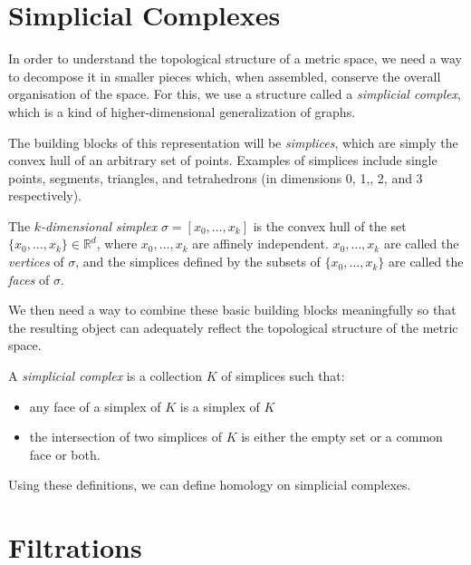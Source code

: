 \documentclass[a4paper,11pt,openany,extrafontsizes]{memoir}
\begin{document}
\section{Simplicial Complexes}%
\label{sec:simplicial-complexes}

In order to understand the topological structure of a metric space, we
need a way to decompose it in smaller pieces which, when assembled,
conserve the overall organisation of the space. For this, we use a
structure called a \emph{simplicial complex}, which is a kind of
higher-dimensional generalization of graphs.

The building blocks of this representation will be \emph{simplices},
which are simply the convex hull of an arbitrary set of
points. Examples of simplices include single points, segments,
triangles, and tetrahedrons (in dimensions 0, 1,, 2, and 3
respectively).

\begin{defn}[Simplex]
  The \emph{$k$-dimensional simplex} $\sigma = [x_0,\ldots,x_k]$ is
  the convex hull of the set $\{x_0,\ldots,x_k\} \in \mathbb{R}^d$,
  where $x_0,\ldots,x_k$ are affinely independent. $x_0,\ldots,x_k$
  are called the \emph{vertices} of $\sigma$, and the simplices
  defined by the subsets of $\{x_0,\ldots,x_k\}$ are called the
  \emph{faces} of $\sigma$.
\end{defn}

We then need a way to combine these basic building blocks meaningfully
so that the resulting object can adequately reflect the topological
structure of the metric space.

\begin{defn}
  A \emph{simplicial complex} is a collection $K$ of simplices such
  that:
  \begin{itemize}
  \item any face of a simplex of $K$ is a simplex of $K$
  \item the intersection of two simplices of $K$ is either the empty
    set or a common face or both.
  \end{itemize}
\end{defn}


Using these definitions, we can define homology on simplicial
complexes. %

\section{Filtrations}%
\label{sec:filtrations}
\end{document}
